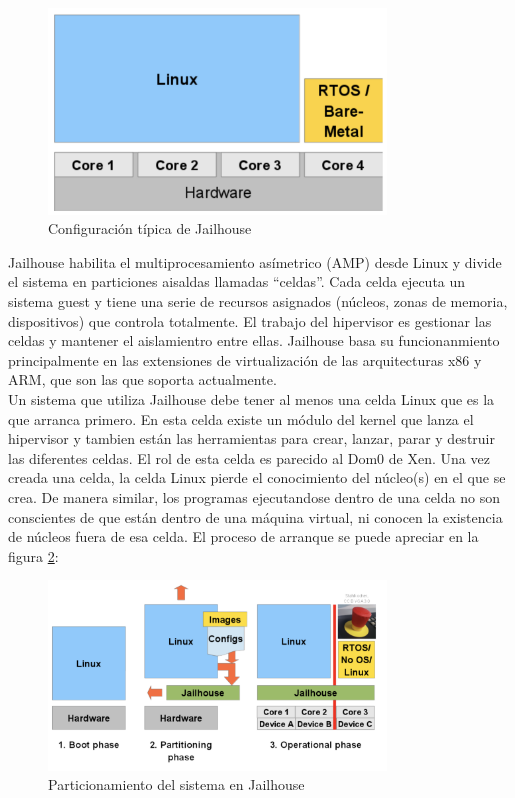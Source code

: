 \begin{figure}[h]
  \centering
  \includegraphics[width=0.80\textwidth]{recursos/jailhouse_1.png}
  \caption{Configuración típica de Jailhouse}
  \label{fig:jail_1}
\end{figure}

Jailhouse habilita el multiprocesamiento asímetrico (AMP) desde Linux y divide el sistema en particiones aisaldas llamadas ``celdas''. Cada celda ejecuta un sistema guest y tiene una serie de recursos asignados (núcleos, zonas de memoria, dispositivos) que controla totalmente. El trabajo del hipervisor es gestionar las celdas y mantener el aislamientro entre ellas. Jailhouse basa su funcionanmiento principalmente en las extensiones de virtualización de las arquitecturas x86 y ARM, que son las que soporta actualmente.\\
Un sistema que utiliza Jailhouse debe tener al menos una celda Linux que es la que arranca primero. En esta celda existe un módulo del kernel que lanza el hipervisor y tambien están las herramientas para crear, lanzar, parar y destruir las diferentes celdas. El rol de esta celda es parecido al Dom0 de Xen. Una vez creada una celda, la celda Linux pierde el conocimiento del núcleo(s) en el que se crea. De manera similar, los programas ejecutandose dentro de una celda no son conscientes de que están dentro de una máquina virtual, ni conocen la existencia de núcleos fuera de esa celda. El proceso de arranque se puede apreciar en la figura \ref{fig:jail_2}:\\

\begin{figure}[h]
  \centering
  \includegraphics[width=0.80\textwidth]{recursos/jailhouse_2.png}
  \caption{Particionamiento del sistema en Jailhouse}
  \label{fig:jail_2}
\end{figure}
